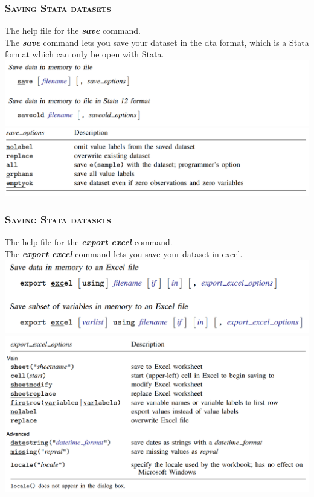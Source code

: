\documentclass[10pt]{beamer}
\begin{document}
	\begin{frame}
	\frametitle{\textsc{Saving Stata datasets}}	
		The help file for the \textbf{\textit{save}} command. \\
		The \textbf{\textit{save}} command lets you save your 
		dataset in the dta format, which is a Stata format which can only be 
		open with Stata. 
			\includegraphics[width=\linewidth]{helpfile_save_1}
			\includegraphics[width=\linewidth]{helpfile_save_2}
	\end{frame}

	\begin{frame}
	\frametitle{\textsc{Saving Stata datasets}}	
		The help file for the \textbf{\textit{export excel}} command.	\\
		\vspace{1mm}
		The \textbf{\textit{export excel}} command lets you save your dataset
		in excel.
			\includegraphics[width=\linewidth]{helpfile_exportexcel_1}
			\includegraphics[width=\linewidth]{helpfile_exportexcel_2}
	\end{frame}
	
\end{document}
